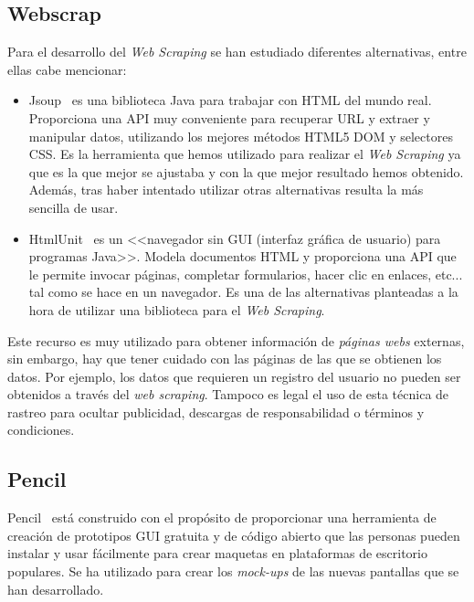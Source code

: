 \subsection{Webscrap}
Para el desarrollo del \emph{Web Scraping} se han estudiado diferentes alternativas, entre ellas cabe mencionar:
\begin{itemize}
	
\item Jsoup~\cite{jsoup} es una biblioteca Java para trabajar con HTML del mundo real. Proporciona una API muy conveniente para recuperar URL y extraer y manipular datos, utilizando los mejores métodos HTML5 DOM y selectores CSS. 
Es la herramienta que hemos utilizado para realizar el \emph{Web Scraping} ya que es la que mejor se ajustaba y con la que mejor resultado hemos obtenido. Además, tras haber intentado utilizar otras alternativas resulta la más sencilla de usar.


\item HtmlUnit~\cite{HTMLUNIT} es un <<navegador sin GUI (interfaz gráfica de usuario) para programas Java>>. Modela documentos HTML y proporciona una API que le permite invocar páginas, completar formularios, hacer clic en enlaces, etc... tal como se hace en un navegador. 
Es una de las alternativas planteadas a la hora de utilizar una biblioteca para el \emph{Web Scraping}.

\end{itemize}
Este recurso es muy utilizado para obtener información de \emph{páginas webs} externas, sin embargo, hay que tener cuidado con las páginas de las que se obtienen los datos. Por ejemplo, los datos que requieren un registro del usuario no pueden ser obtenidos a través del \emph{web scraping}.
Tampoco es legal el uso de esta técnica de rastreo para ocultar publicidad, descargas de responsabilidad o términos y condiciones.~\cite{webScrap}

\subsection{Pencil}
Pencil~\cite{Pencil_project} está construido con el propósito de proporcionar una herramienta de creación de prototipos GUI gratuita y de código abierto que las personas pueden instalar y usar fácilmente para crear maquetas en plataformas de escritorio populares. 
Se ha utilizado para crear los \emph{mock-ups} de las nuevas pantallas que se han desarrollado.


